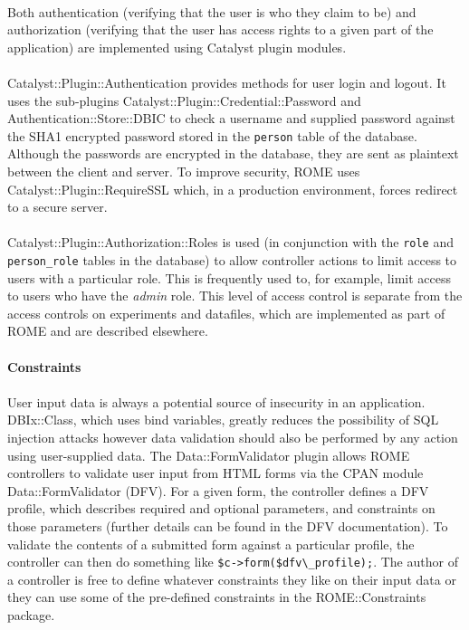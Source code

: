 \paragraph{}
Both authentication (verifying that the user is who they claim to be) and authorization (verifying that the user has access rights to a given part of the application) are implemented using Catalyst plugin modules. 

\paragraph{}
Catalyst::Plugin::Authentication provides methods for user login and logout. It uses the sub-plugins Catalyst::Plugin::Credential::Password and Authentication::Store::DBIC to check a username and supplied password against the SHA1 encrypted password stored in the \texttt{person} table of the database. Although the passwords are encrypted in the database, they are sent as plaintext between the client and server. To improve security, ROME uses Catalyst::Plugin::RequireSSL which, in a production environment, forces redirect to a secure server.

\paragraph{}
Catalyst::Plugin::Authorization::Roles is used (in conjunction with the \texttt{role} and \texttt{person\_role} tables in the database) to allow controller actions to limit access to users with a particular role. This is frequently used to, for example, limit access to users who have the \textit{admin} role. This level of access control is separate from the access controls on experiments and datafiles, which are implemented as part of ROME and are described elsewhere.


\paragraph{Constraints}

\paragraph{}
User input data is always a potential source of insecurity in an application. DBIx::Class, which uses bind variables, greatly reduces the possibility of SQL injection attacks however data validation should also be performed by any action using user-supplied data. The Data::FormValidator plugin allows ROME controllers to validate user input from HTML forms via the CPAN module Data::FormValidator (DFV). For a given form, the controller defines a DFV profile, which describes required and optional parameters, and constraints on those parameters (further details can be found in the DFV documentation). To validate the contents of a submitted form against a particular profile, the controller can then do something like \verb|$c->form($dfv\_profile);|. The author of a controller is free to define whatever constraints they like on their input data or they can use some of the pre-defined constraints in the ROME::Constraints package.

